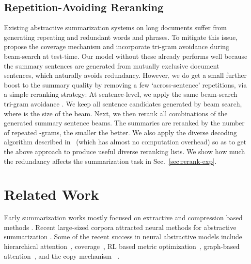 \documentclass[11pt,a4paper]{article}
\def\secref#1{Sec.~\ref{#1}}
\begin{document}
\subsection{Repetition-Avoiding Reranking}
\label{sec:rerank}
Existing abstractive summarization systems on long documents suffer from generating repeating and redundant words and phrases.
To mitigate this issue, \citet{get_to_the_point} propose the coverage mechanism and \citet{DBLP:journals/corr/PaulusXS17} incorporate tri-gram avoidance during beam-search at test-time.
Our model without these already performs well because the summary sentences are generated from mutually exclusive document sentences, which naturally avoids redundancy.
However, we do get a small further boost to the summary quality by removing a few `across-sentence' repetitions, via a simple reranking strategy: At sentence-level, we apply the same beam-search tri-gram avoidance \citep{DBLP:journals/corr/PaulusXS17}.
We keep all  sentence candidates generated by beam search, where  is the size of the beam.
Next, we then rerank all  combinations of the  generated summary sentence beams.
The summaries are reranked by the number of repeated -grams, the smaller the better.
We also apply the diverse decoding algorithm described in~ (which has almost no computation overhead) so as to get the above approach to produce useful diverse reranking lists. 
We show how much the redundancy affects the summarization task in \secref{sec:rerank-exp}.

 
\section{Related Work}
Early summarization works mostly focused on extractive and compression based methods
\citep{Jing:2000:CPB:974305.974329,Knight:2000:SSS:647288.721086,Clarke:Lapata:2010,Berg-Kirkpatrick:2011:JLE:2002472.2002534,filippova:43852}.
Recent large-sized corpora attracted neural methods for abstractive summarization
\citep{rush-chopra-weston:2015:EMNLP,chopra-auli-rush:2016:N16-1}.
Some of the recent success in neural abstractive models include hierarchical attention~\cite{nallapati2016abstractive},
coverage~\cite{Suzuki2016Summ,Chen2016DistractionBasedNN,get_to_the_point}, RL based metric optimization~\cite{DBLP:journals/corr/PaulusXS17}, graph-based attention~\cite{graph_attn_Tan2017AbstractiveDS}, and the copy mechanism~ \cite{DBLP:journals/corr/MiaoB16,gu-EtAl:2016:P16-1:copying_mechanism,get_to_the_point}.
\end{document}
